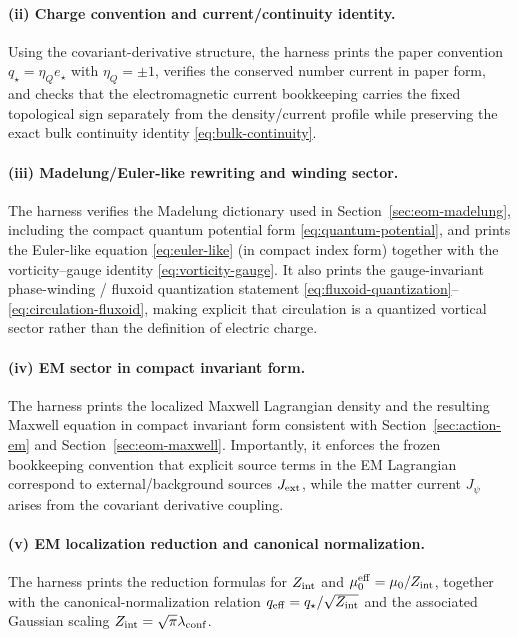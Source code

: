 \documentclass[11pt]{article}
\newcommand{\etaQ}{\eta_Q}
\newcommand{\estar}{e_\star}
\newcommand{\qstar}{q_\star}
\newcommand{\qeff}{q_{\rm eff}}
\newcommand{\Zint}{Z_{\rm int}}
\begin{document}
\paragraph{(ii) Charge convention and current/continuity identity.}
Using the covariant-derivative structure, the harness prints the paper convention $\qstar=\etaQ\estar$ with $\etaQ=\pm1$, verifies the conserved number current in paper form, and checks that the electromagnetic current bookkeeping carries the fixed topological sign separately from the density/current profile while preserving the exact bulk continuity identity \eqref{eq:bulk-continuity}.

\paragraph{(iii) Madelung/Euler-like rewriting and winding sector.}
The harness verifies the Madelung dictionary used in Section~\ref{sec:eom-madelung}, including the compact quantum potential form \eqref{eq:quantum-potential}, and prints the Euler-like equation \eqref{eq:euler-like} (in compact index form) together with the vorticity--gauge identity \eqref{eq:vorticity-gauge}. It also prints the gauge-invariant phase-winding / fluxoid quantization statement \eqref{eq:fluxoid-quantization}--\eqref{eq:circulation-fluxoid}, making explicit that circulation is a quantized vortical sector rather than the definition of electric charge.

\paragraph{(iv) EM sector in compact invariant form.}
The harness prints the localized Maxwell Lagrangian density and the resulting Maxwell equation in compact invariant form consistent with Section~\ref{sec:action-em} and Section~\ref{sec:eom-maxwell}. Importantly, it enforces the frozen bookkeeping convention that explicit source terms in the EM Lagrangian correspond to external/background sources $J_{\rm ext}$, while the matter current $J_\psi$ arises from the covariant derivative coupling.

\paragraph{(v) EM localization reduction and canonical normalization.}
The harness prints the reduction formulas for $\Zint$ and $\mu_0^{\rm eff}=\mu_0/\Zint$, together with the canonical-normalization relation $\qeff=\qstar/\sqrt{\Zint}$ and the associated Gaussian scaling $\Zint=\sqrt{\pi}\lambda_{\rm conf}$.
\end{document}
